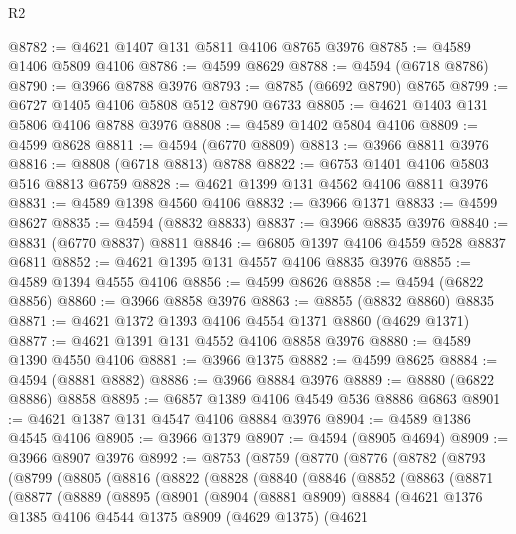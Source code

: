 \begin{lexlean}{R2}
\begin{coremodule}
@8782 := @4621 @1407 @131 @5811 @4106 @8765 @3976
@8785 := @4589 @1406 @5809 @4106
@8786 := @4599 @8629
@8788 := @4594 (@6718 @8786)
@8790 := @3966 @8788 @3976
@8793 := @8785 (@6692 @8790) @8765
@8799 := @6727 @1405 @4106 @5808 @512 @8790 @6733
@8805 := @4621 @1403 @131 @5806 @4106 @8788 @3976
@8808 := @4589 @1402 @5804 @4106
@8809 := @4599 @8628
@8811 := @4594 (@6770 @8809)
@8813 := @3966 @8811 @3976
@8816 := @8808 (@6718 @8813) @8788
@8822 := @6753 @1401 @4106 @5803 @516 @8813 @6759
@8828 := @4621 @1399 @131 @4562 @4106 @8811 @3976
@8831 := @4589 @1398 @4560 @4106
@8832 := @3966 @1371
@8833 := @4599 @8627
@8835 := @4594 (@8832 @8833)
@8837 := @3966 @8835 @3976
@8840 := @8831 (@6770 @8837) @8811
@8846 := @6805 @1397 @4106 @4559 @528 @8837 @6811
@8852 := @4621 @1395 @131 @4557 @4106 @8835 @3976
@8855 := @4589 @1394 @4555 @4106
@8856 := @4599 @8626
@8858 := @4594 (@6822 @8856)
@8860 := @3966 @8858 @3976
@8863 := @8855 (@8832 @8860) @8835
@8871 := @4621 @1372 @1393 @4106 @4554 @1371 @8860 (@4629 @1371)
@8877 := @4621 @1391 @131 @4552 @4106 @8858 @3976
@8880 := @4589 @1390 @4550 @4106
@8881 := @3966 @1375
@8882 := @4599 @8625
@8884 := @4594 (@8881 @8882)
@8886 := @3966 @8884 @3976
@8889 := @8880 (@6822 @8886) @8858
@8895 := @6857 @1389 @4106 @4549 @536 @8886 @6863
@8901 := @4621 @1387 @131 @4547 @4106 @8884 @3976
@8904 := @4589 @1386 @4545 @4106
@8905 := @3966 @1379
@8907 := @4594 (@8905 @4694)
@8909 := @3966 @8907 @3976
@8992 := @8753
    (@8759
      (@8770
        (@8776
          (@8782
            (@8793
              (@8799
                (@8805
                  (@8816
                    (@8822
                      (@8828
                        (@8840
                          (@8846
                            (@8852
                              (@8863
                                (@8871
                                  (@8877
                                    (@8889
                                      (@8895
                                        (@8901
                                          (@8904
                                            (@8881 @8909)
                                            @8884
                                            (@4621
                                              @1376
                                              @1385
                                              @4106
                                              @4544
                                              @1375
                                              @8909
                                              (@4629 @1375)
                                              (@4621

\end{coremodule}
\end{lexlean}
